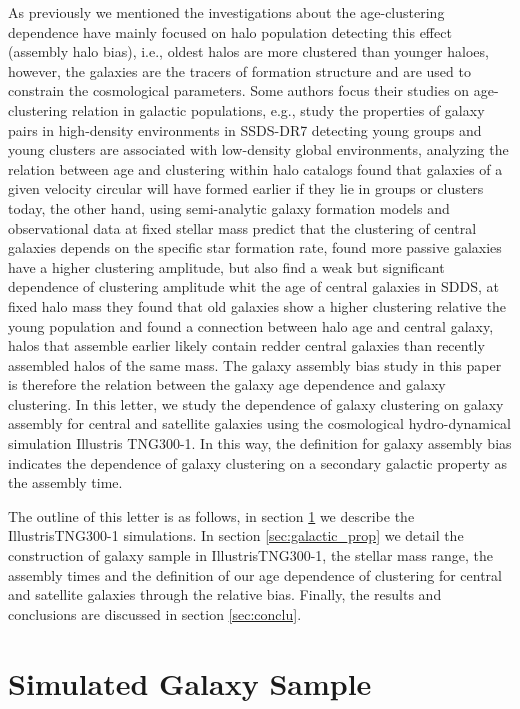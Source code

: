 \documentclass[fleqn,usenatbib]{mnras}
\begin{document}
As previously we mentioned the investigations about the age-clustering
dependence have mainly focused on halo population detecting this
effect (assembly halo bias), i.e., oldest halos are more clustered
than younger haloes, however, the galaxies are the tracers of
formation structure and are used to constrain the cosmological
parameters. Some authors focus their studies on age-clustering
relation in galactic populations, e.g., \citet{2012A&A...539A..46A}
study the properties of galaxy pairs in high-density environments in
SSDS-DR7 detecting young groups and young clusters are associated with
low-density global environments, \citet{2007MNRAS.378..777R} analyzing
the relation between age and clustering within halo catalogs found
that galaxies of a given velocity circular will have formed earlier if
they lie in groups or clusters today, the other hand, using
semi-analytic galaxy formation models and observational data at fixed
stellar mass \citet{2013MNRAS.433..515W} predict that the clustering
of central galaxies depends on the specific star formation rate, found
more passive galaxies have a higher clustering amplitude, but
\citet{Lacerna_2014} also find a weak but significant dependence of
clustering amplitude whit the age of central galaxies in SDDS, at
fixed halo mass they found that old galaxies show a higher clustering
relative the young population and \citet{Berlind:2006eb} found a
connection between halo age and central galaxy, halos that assemble
earlier likely contain redder central galaxies than recently assembled
halos of the same mass. The galaxy assembly bias study in this paper
is therefore the relation between the galaxy age dependence and galaxy
clustering. In this letter, we study the dependence of galaxy
clustering on galaxy assembly for central and satellite galaxies using
the cosmological hydro-dynamical simulation Illustris TNG300-1. In
this way, the definition for galaxy assembly bias indicates the
dependence of galaxy clustering on a secondary galactic property as
the assembly time. 

The outline of this letter is as follows, in section \ref{sec:simul}
we describe the IllustrisTNG300-1 simulations. In section
\ref{sec:galactic_prop} we detail the construction of galaxy sample in
IllustrisTNG300-1, the stellar mass range, the assembly times and the
definition of our age dependence of clustering for central and
satellite galaxies through the relative bias. Finally, the results and
conclusions are discussed in section \ref{sec:conclu}. 


\section{Simulated Galaxy Sample}
\label{sec:simul} %
\end{document}
